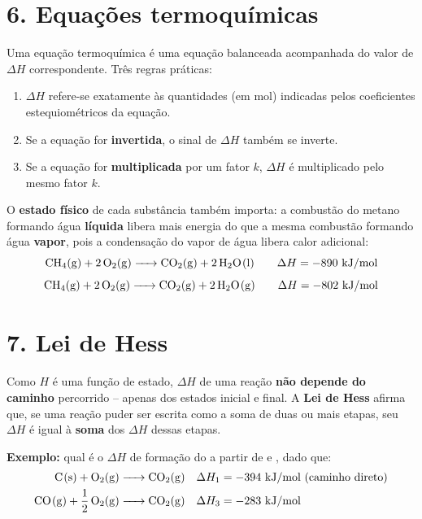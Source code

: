 \documentclass[11pt,a4paper]{article}
\begin{document}
\clearpage

\section*{6. Equações termoquímicas}

Uma equação termoquímica é uma equação balanceada acompanhada do valor de
$\Delta H$ correspondente. Três regras práticas:

\begin{enumerate}
\item $\Delta H$ refere-se exatamente às quantidades (em mol) indicadas
  pelos coeficientes estequiométricos da equação.
\item Se a equação for \textbf{invertida}, o sinal de $\Delta H$ também se
  inverte.
\item Se a equação for \textbf{multiplicada} por um fator $k$, $\Delta H$
  é multiplicado pelo mesmo fator $k$.
\end{enumerate}

O \textbf{estado físico} de cada substância também importa: a combustão do
metano formando água \textbf{líquida} libera mais energia do que a mesma
combustão formando água \textbf{vapor}, pois a condensação do vapor de
água libera calor adicional:
$$\ce{CH4(g) + 2O2(g) -> CO2(g) + 2H2O(l)} \qquad \Delta H = -890~\text{kJ/mol}$$
$$\ce{CH4(g) + 2O2(g) -> CO2(g) + 2H2O(g)} \qquad \Delta H = -802~\text{kJ/mol}$$

\section*{7. Lei de Hess}

Como $H$ é uma função de estado, $\Delta H$ de uma reação \textbf{não
depende do caminho} percorrido -- apenas dos estados inicial e final. A
\textbf{Lei de Hess} afirma que, se uma reação puder ser escrita como a
soma de duas ou mais etapas, seu $\Delta H$ é igual à \textbf{soma} dos
$\Delta H$ dessas etapas.

\textbf{Exemplo:} qual é o $\Delta H$ de formação do  a partir de
 e , dado que:
\begin{align*}
\ce{C(s) + O2(g) &-> CO2(g)} &\Delta H_1 &= -394~\text{kJ/mol (caminho direto)}\\
\ce{CO(g) + 1/2 O2(g) &-> CO2(g)} &\Delta H_3 &= -283~\text{kJ/mol}
\end{align*}
\end{document}
